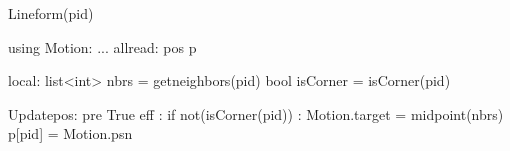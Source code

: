 Lineform(pid)

using Motion:
...
allread:
  pos p$\label{shapeformp}$

local:
  list<int> nbrs = getneighbors(pid) 
  bool isCorner = isCorner(pid)

Updatepos:
  pre True
  eff :
     if not(isCorner(pid)) :
        Motion.target = midpoint(nbrs)
    p[pid] = Motion.psn

